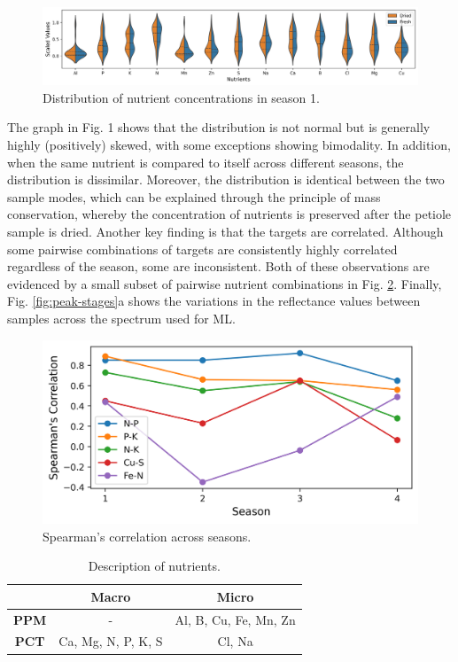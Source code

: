 \documentclass[conference]{IEEEtran}
\begin{document}
\begin{figure}
    \centering
    \includegraphics[width=1\linewidth]{Figures/distr_viol_plot.png}
    \caption{Distribution of nutrient concentrations in season 1.}
    \label{fig:distr_viol}
\end{figure}

The graph in Fig. 1 shows that the distribution is not normal but is generally highly (positively) skewed, with some exceptions showing bimodality. In addition, when the same nutrient is compared to itself across different seasons, the distribution is dissimilar. Moreover, the distribution is identical between the two sample modes, which can be explained through the principle of mass conservation, whereby the concentration of nutrients is preserved after the petiole sample is dried. Another key finding is that the targets are correlated. Although some pairwise combinations of targets are consistently highly correlated regardless of the season, some are inconsistent. Both of these observations are evidenced by a small subset of pairwise nutrient combinations in Fig. \ref{fig:corr_vals}. Finally, Fig. \ref{fig:peak-stages}a shows the variations in the reflectance values between samples across the spectrum used for ML.

\begin{figure}[b]
    \centering
    \includegraphics[width=1\linewidth]{Figures/corr_vals.png}
    \caption{Spearman's correlation across seasons.}
    \label{fig:corr_vals}
\end{figure}

\begin{table}
    \caption{Description of nutrients.}
    \centering
    \begin{tabular}{|c|c|c|}\hline
         & \textbf{Macro} & \textbf{Micro} \\\hline
        \textbf{PPM} & - & Al, B, Cu, Fe, Mn, Zn\\\hline
        \textbf{PCT} & Ca, Mg, N, P, K, S  & Cl, Na \\\hline
    \end{tabular}
    \label{tab:desc_nutrients}
\end{table}
\end{document}
